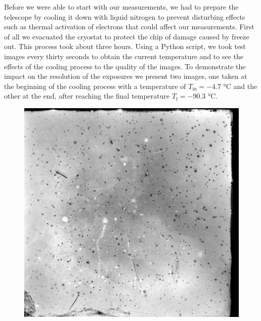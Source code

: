 Before we were able to start with our measurements, we had to prepare the telescope by cooling it down with liquid nitrogen to prevent disturbing effects such as thermal activation of electrons that could affect our measurements. First of all we evacuated the cryostat to protect the chip of damage caused by freeze out. This process took about three hours. Using a Python script, we took test images every thirty seconds to obtain the current temperature and to see the effects of the cooling process to the quality of the images. To demonstrate the impact on the resolution of the exposures we present two images, one taken at the beginning of the cooling process with a temperature of $T_{\text{in}} = -4.7$ °C  and the other at the end, after reaching the final temperature $T_{\text{f}} = -90.3$ °C.
\begin{figure}[H]
	\begin{minipage}{0.35\textwidth}
	\hspace{0.15\textwidth}
		\includegraphics[scale = 0.17]{figures/Exposures/cooling_start}
	\end{minipage}
	\hfill
	\begin{minipage}{0.35\textwidth}
		\hspace{-0.4\textwidth}

\end{minipage}
\end{figure}

